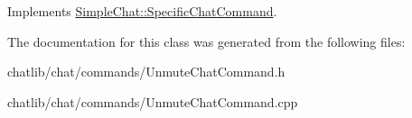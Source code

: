Implements \hyperlink{classSimpleChat_1_1SpecificChatCommand}{Simple\-Chat\-::\-Specific\-Chat\-Command}.



The documentation for this class was generated from the following files\-:\begin{DoxyCompactItemize}
\item 
chatlib/chat/commands/Unmute\-Chat\-Command.\-h\item 
chatlib/chat/commands/Unmute\-Chat\-Command.\-cpp\end{DoxyCompactItemize}
